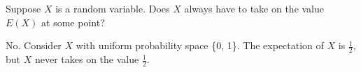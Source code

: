 \question Suppose $X$ is a random variable. Does $X$ always have to take on the value $E(X)$ at some point?
\begin{solution}[1cm]
No. Consider $X$ with uniform probability space \{0, 1\}. The expectation of $X$ is $\frac{1}{2}$, but $X$ never takes on the value $\frac{1}{2}$.
\end{solution}